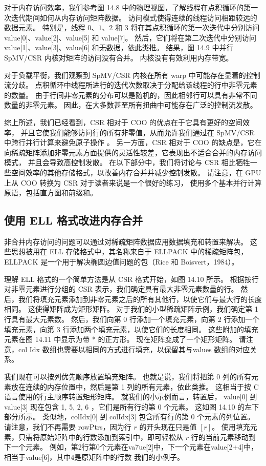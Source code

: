 对于内存访问效率，我们参考图 14.8 中的物理视图，了解线程在点积循环的第一次迭代期间如何从内存访问矩阵数据。 
访问模式使得连续的线程访问相距较远的数据元素。 
特别是，线程 $0、1、2$ 和 3 将在其点积循环的第一次迭代中分别访问 value[0]、value[2]、value[5] 和 value[7]。 
然后，它们将在第二次迭代中分别访问 value[1]、value[3]、value[6] 和无数据，依此类推。 
结果，图 14.9 中并行 SpMV/CSR 内核对矩阵的访问没有合并。 内核没有有效利用内存带宽。

对于负载平衡，我们观察到 SpMV/CSR 内核在所有 warp 中可能存在显着的控制流分歧。 
点积循环中线程所进行的迭代次数取决于分配给该线程的行中非零元素的数量。 由于行间非零元素的分布可以是随机的，因此相邻行可以具有非常不同数量的非零元素。 因此，在大多数甚至所有扭曲中可能存在广泛的控制流发散。

综上所述，我们已经看到，CSR 相对于 COO 的优点在于它具有更好的空间效率，
并且它使我们能够访问行的所有非零值，从而允许我们通过在 SpMV/CSR 中跨行并行计算来避免原子操作 。 
另一方面，CSR 相对于 COO 的缺点是，它在向稀疏矩阵添加非零元素方面提供的灵活性较差，它表现出不适合合并的内存访问模式，
并且会导致高控制发散。 在以下部分中，我们将讨论与 CSR 相比牺牲一些空间效率的其他存储格式，以改善内存合并并减少控制发散。 
请注意，在 GPU 上从 $\mathrm{COO}$ 转换为 CSR 对于读者来说是一个很好的练习，
使用多个基本并行计算原语，包括直方图和前缀和。

\subsection{使用 ELL 格式改进内存合并}
非合并内存访问的问题可以通过对稀疏矩阵数据应用数据填充和转置来解决。 
这些思想被用在 ELL 存储格式中，其名称来自于 ELLPACK 中的稀疏矩阵包，
ELLPACK 是一个用于解决椭圆边值问题的包（Rice 和 Boisvert，1984）。

理解 ELL 格式的一个简单方法是从 CSR 格式开始，如图 14.10 所示。 
根据按行对非零元素进行分组的 CSR 表示，我们确定具有最大非零元素数量的行。 
然后，我们将填充元素添加到非零元素之后的所有其他行，以使它们与最大行的长度相同。 这使得矩阵成为矩形矩阵。 
对于我们的小型稀疏矩阵示例，我们确定第 1 行具有最大元素数。 
然后，我们向第 0 行添加一个填充元素，向第 2 行添加一个填充元素，向第 3 行添加两个填充元素，以使它们的长度相同。 
这些附加的填充元素在图 14.11 中显示为带 * 的正方形。 现在矩阵变成了一个矩形矩阵。 
请注意，col Idx 数组也需要以相同的方式进行填充，以保留其与values 数组的对应关系。

我们现在可以按列优先顺序放置填充矩阵。 
也就是说，我们将把第 0 列的所有元素放在连续的内存位置中，然后是第 1 列的所有元素，依此类推。 
这相当于按 $\mathrm{C}$ 语言使用的行主顺序转置矩形矩阵。 
就我们的小示例而言，转置后， value[0] 到 value[3] 现在包含 1, 5, 2, 6 ，它们是所有行的第 0 个元素。 
这如图 14.10 的左下部分所示。 类似地，colIdx[0] 到 colIdx[3] 包含所有行的第 0 个元素的列位置。 
请注意，我们不再需要 rowPtrs，因为行 $r$ 的开头现在只是值 $[r]$。 
使用填充元素，只需将原始矩阵中的行数添加到索引中，即可轻松从 $r$ 行的当前元素移动到下一个元素。 
例如，第2行第0个元素在va7ue[2]中，下一个元素在value[2+4]中，相当于value[6]，其中4是原矩阵中的行数 我们的小例子。

